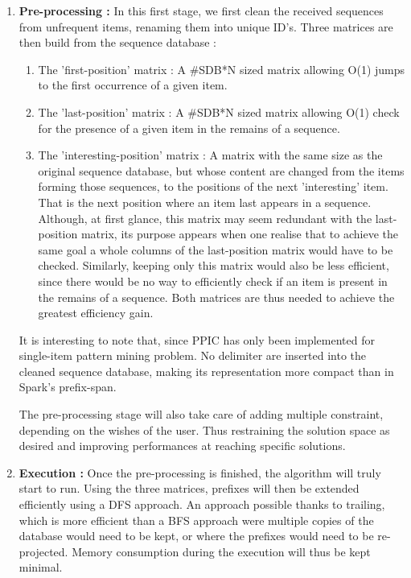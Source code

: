 \documentclass{eplmastersthesis}
\begin{document}
\begin{enumerate}
\item \textbf{Pre-processing :} In this first stage, we first clean the received sequences from unfrequent items, renaming them into unique ID's. Three matrices are then build from the sequence database :
	\begin{enumerate}
		\item The 'first-position' matrix : A \#SDB*N sized matrix allowing O(1) jumps to the first occurrence of a given item. 
		\item The 'last-position' matrix : A  \#SDB*N sized matrix allowing O(1) check for the presence of a given item in the remains of a sequence.
		\item The 'interesting-position' matrix : A matrix with the same size as the original sequence database, but whose content are changed from the items forming those sequences, to the positions of the next 'interesting' item. That is the next position where an item last appears in a sequence. \\ Although, at first glance, this matrix may seem redundant with the last-position matrix, its purpose appears when one realise that to achieve the same goal a whole columns of the last-position matrix would have to be checked. Similarly, keeping only this matrix would also be less efficient, since there would be no way to efficiently check if an item is present in the remains of a sequence. Both matrices are thus needed to achieve the greatest efficiency gain. 
	\end{enumerate}
	It is interesting to note that, since PPIC has only been implemented for single-item pattern mining problem. No delimiter are inserted into the cleaned sequence database, making its representation more compact than in Spark's prefix-span. \newline
	
	The pre-processing stage will also take care of adding multiple constraint, depending on the wishes of the user. Thus restraining the solution space as desired and improving performances at reaching specific solutions.
	
\item \textbf{Execution :} Once the pre-processing is finished, the algorithm will truly start to run. Using the three matrices, prefixes will then be extended efficiently using a DFS approach. An approach possible thanks to trailing, which is more efficient than a BFS approach were multiple copies of the database would need to be kept, or where the prefixes would need to be re-projected. Memory consumption during the execution will thus be kept minimal. \newline


\end{enumerate}
\end{document}
